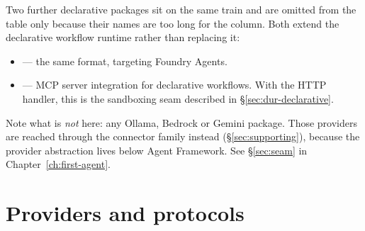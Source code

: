 Two further declarative packages sit on the same train and are omitted from the
table only because their names are too long for the column. Both extend the
declarative workflow runtime rather than replacing it:

\begin{itemize}[leftmargin=1.4em,nosep]
\item {} --- the same
      format, targeting Foundry Agents.
\item {} --- MCP server
      integration for declarative workflows. With the HTTP handler, this is the
      sandboxing seam described in \S\ref{sec:dur-declarative}.
\end{itemize}

\begin{note}
Note what is \emph{not} here: any Ollama, Bedrock or Gemini package. Those
providers are reached through the  connector
family instead (\S\ref{sec:supporting}), because the provider abstraction lives
below Agent Framework. See \S\ref{sec:seam} in Chapter~\ref{ch:first-agent}.
\end{note}

\section{Providers and protocols}

